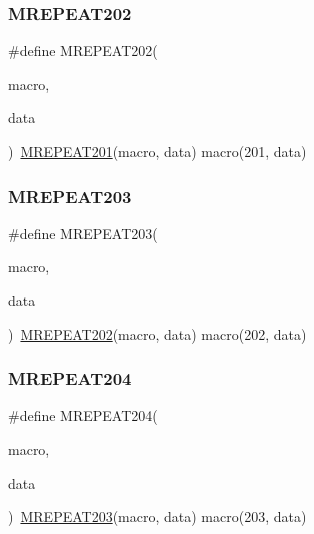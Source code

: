 \mbox{\label{group__group__sam0__utils__mrepeat_ga5a2a3af10439763667d2adee22e01fff}} 
\subsubsection{\texorpdfstring{MREPEAT202}{MREPEAT202}}
{\footnotesize\ttfamily \#define M\+R\+E\+P\+E\+A\+T202(\begin{DoxyParamCaption}\item[{}]{macro,  }\item[{}]{data }\end{DoxyParamCaption})~\mbox{\hyperlink{group__group__sam0__utils__mrepeat_gae15bf8ac240e5b8bb7d7fc73c7b58e41}{M\+R\+E\+P\+E\+A\+T201}}(macro, data)   macro(201, data)}

\mbox{\label{group__group__sam0__utils__mrepeat_ga017ff6b502ad948e0419894957597258}} 
\subsubsection{\texorpdfstring{MREPEAT203}{MREPEAT203}}
{\footnotesize\ttfamily \#define M\+R\+E\+P\+E\+A\+T203(\begin{DoxyParamCaption}\item[{}]{macro,  }\item[{}]{data }\end{DoxyParamCaption})~\mbox{\hyperlink{group__group__sam0__utils__mrepeat_ga5a2a3af10439763667d2adee22e01fff}{M\+R\+E\+P\+E\+A\+T202}}(macro, data)   macro(202, data)}

\mbox{\label{group__group__sam0__utils__mrepeat_ga0e339097dee89fd4eaf9885f32db1c16}} 
\subsubsection{\texorpdfstring{MREPEAT204}{MREPEAT204}}
{\footnotesize\ttfamily \#define M\+R\+E\+P\+E\+A\+T204(\begin{DoxyParamCaption}\item[{}]{macro,  }\item[{}]{data }\end{DoxyParamCaption})~\mbox{\hyperlink{group__group__sam0__utils__mrepeat_ga017ff6b502ad948e0419894957597258}{M\+R\+E\+P\+E\+A\+T203}}(macro, data)   macro(203, data)}


